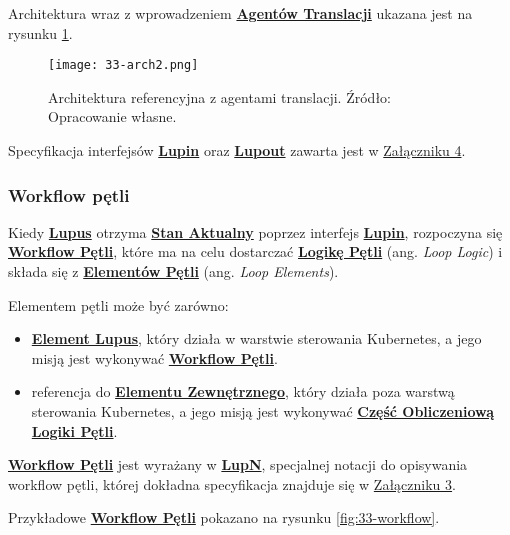 Architektura wraz z wprowadzeniem \hyperlink{def:agent-translacji}{\textbf{Agentów Translacji}} ukazana jest na rysunku \ref{fig:33-arch2}.

\begin{figure}[!h]
    \centering \texttt{[image: 33-arch2.png]}
    \caption{Architektura referencyjna z agentami translacji. Źródło: Opracowanie własne.}\label{fig:33-arch2}
\end{figure}

Specyfikacja interfejsów \hyperlink{def:interfejs-lupin}{\textbf{Lupin}} oraz \hyperlink{def:interfejs-lupout}{\textbf{Lupout}} zawarta jest w \hyperref[appendix:4]{Załączniku 4}.

\subsubsection{Workflow pętli}

Kiedy \hyperlink{def:lupus}{\textbf{Lupus}} otrzyma \hyperlink{def:stan-aktualny}{\textbf{Stan Aktualny}} poprzez interfejs \hyperlink{def:interfejs-lupin}{\textbf{Lupin}}, rozpoczyna się \hyperlink{def:workflow-petli}{\textbf{Workflow Pętli}}, które ma na celu dostarczać \hyperlink{def:logika-petli}{\textbf{Logikę Pętli}} (ang. \textit{Loop Logic}) i składa się z \hyperlink{def:element-petli}{\textbf{Elementów Pętli}} (ang. \textit{Loop Elements}). 

Elementem pętli może być zarówno:
\begin{itemize}
    \item \hyperlink{def:element-lupus}{\textbf{Element Lupus}}, który działa w warstwie sterowania Kubernetes, a jego misją jest wykonywać \hyperlink{def:workflow-petli}{\textbf{Workflow Pętli}}.
    \item referencja do \hyperlink{def:element-zewnetrzny}{\textbf{Elementu Zewnętrznego}}, który działa poza warstwą sterowania Kubernetes, a jego misją jest wykonywać \hyperlink{def:czesc-obliczeniowa}{\textbf{Część Obliczeniową}} \hyperlink{def:logika-petli}{\textbf{Logiki Pętli}}.
\end{itemize}

\hyperlink{def:workflow-petli}{\textbf{Workflow Pętli}} jest wyrażany w \hyperlink{def:lupn}{\textbf{LupN}}, specjalnej notacji do opisywania workflow pętli, której dokładna specyfikacja znajduje się w \hyperref[appendix:3]{Załączniku 3}.

Przykładowe \hyperlink{def:workflow-petli}{\textbf{Workflow Pętli}} pokazano na rysunku \ref{fig:33-workflow}.

